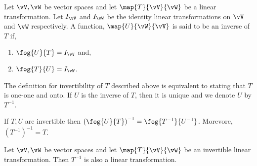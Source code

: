 \begin{Definition}
    Let $\vV,\vW$ be vector spaces and let $\map{T}{\vV}{\vW}$ be a linear transformation. Let $I_{\vV}$ and
    $I_{\vW}$ be the identity linear transformations on $\vV$ and $\vW$ respectively. A function,
    $\map{U}{\vW}{\vV}$ is said to be an inverse of $T$ if,
    \begin{enumerate}
	\item
	    $\fog{U}{T} = I_{\vV}$ and,
	\item
	    $\fog{T}{U} = I_{\vW}$.
    \end{enumerate}
\end{Definition}
\begin{Remark}
    The definition for invertibility of $T$ described above is equivalent to stating that $T$ is one-one and
    onto. If $U$ is the inverse of $T$, then it is unique and we denote $U$ by $T^{-1}$.
\end{Remark}
\begin{Remark}
    If $T,U$ are invertible then ${(\fog{U}{T})}^{-1} = \fog{T^{-1}}{U^{-1}}$. Morevore, ${(T^{-1})}^{-1} =
    T$.
\end{Remark}
\begin{Theorem}
    Let $\vV,\vW$ be vector spaces and let $\map{T}{\vV}{\vW}$ be an invertible linear transformation. Then
    $T^{-1}$ is also a linear transformation.
\end{Theorem}
\endinput

